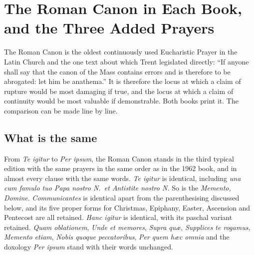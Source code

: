 \section{The Roman Canon in Each Book, and the Three Added Prayers}

The Roman Canon is the oldest continuously used Eucharistic Prayer in the Latin Church and the one text about which Trent legislated directly: ``If anyone shall say that the canon of the Mass contains errors and is therefore to be abrogated: let him be anathema.'' It is therefore the locus at which a claim of rupture would be most damaging if true, and the locus at which a claim of continuity would be most valuable if demonstrable. Both books print it. The comparison can be made line by line.

\subsection{What is the same}

From \emph{Te igitur} to \emph{Per ipsum}, the Roman Canon stands in the third typical edition with the same prayers in the same order as in the 1962 book, and in almost every clause with the same words. \emph{Te igitur} is identical, including \emph{una cum famulo tuo Papa nostro N.\ et Antistite nostro N.} So is the \emph{Memento, Domine}. \emph{Communicantes} is identical apart from the parenthesising discussed below, and its five proper forms for Christmas, Epiphany, Easter, Ascension and Pentecost are all retained. \emph{Hanc igitur} is identical, with its paschal variant retained. \emph{Quam oblationem}, \emph{Unde et memores}, \emph{Supra quæ}, \emph{Supplices te rogamus}, \emph{Memento etiam}, \emph{Nobis quoque peccatoribus}, \emph{Per quem hæc omnia} and the doxology \emph{Per ipsum} stand with their words unchanged.

